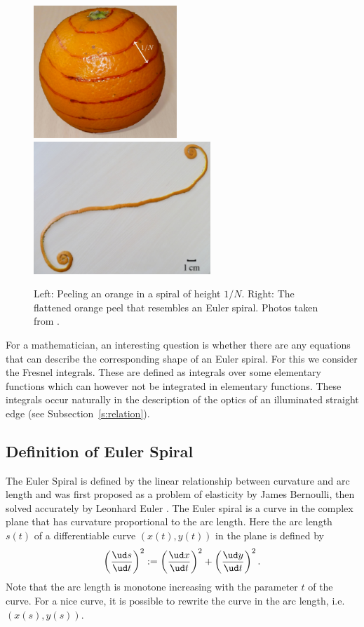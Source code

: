 \documentclass[12pt]{article}
\newcommand\udfrac[2]{\ensuremath{\frac{\ud#1}{\ud #2}}}
\begin{document}
\begin{figure}[h!]
	\centering
	\includegraphics[height=5cm]{orange.jpg} \hfill
	\includegraphics[height=5cm]{orangePeel.jpg}
	\label{f:orangePeel}
	\caption{Left: Peeling an orange in a spiral of height $1/N$.
		Right: The flattened orange peel that resembles an Euler spiral.  Photos taken from \cite{BH12}.
	}
\end{figure}

For a mathematician, an interesting question is whether there are any equations that can describe the corresponding shape of an Euler spiral. For this we consider the Fresnel integrals.  These are defined as integrals over some elementary functions which can however not be integrated in elementary functions.  These integrals occur naturally in the description of the optics of an illuminated straight edge (see Subsection~\ref{s:relation}).


\subsection{Definition of Euler Spiral}
The Euler Spiral is defined by the  linear relationship between curvature and arc length and was
first proposed as a problem of elasticity by James Bernoulli, then solved accurately by Leonhard Euler \cite{Lev08}.
The Euler spiral is a curve in the complex plane that has curvature proportional to the arc length.  Here the arc length $s(t)$ of a differentiable curve $(x(t),y(t))$ in the plane is defined by
\[  \left(\udfrac{s}{t}\right)^2 := \left(\udfrac{x}{t}\right)^2 +\left(\udfrac{y}{t}\right)^2.
\]  Note that the arc length is monotone increasing with the parameter $t$ of the curve.  For a nice curve, it is possible to rewrite the curve in the arc length, i.e.~$(x(s),y(s))$.
\end{document}
